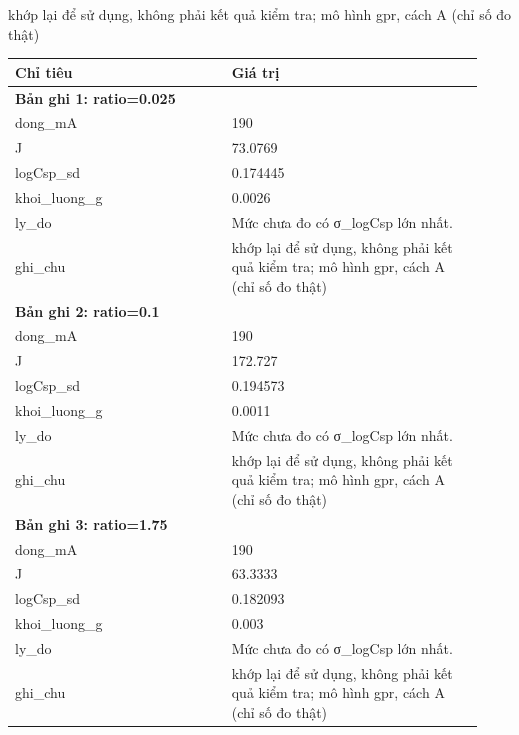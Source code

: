 \par\smallskip\noindent khớp lại để sử dụng, không phải kết quả kiểm tra; mô hình gpr, cách A (chỉ số đo thật)\par
\begin{longtable}{p{0.43\linewidth}p{0.50\linewidth}}
\toprule Chỉ tiêu & Giá trị \\ \midrule \endhead
\multicolumn{2}{p{0.95\linewidth}}{\textbf{Bản ghi 1: ratio=0.025}} \\
dong\_\allowbreak mA & 190 \\
J & 73.0769 \\
logCsp\_\allowbreak sd & 0.174445 \\
khoi\_\allowbreak luong\_\allowbreak g & 0.0026 \\
ly\_\allowbreak do & Mức chưa đo có σ\_logCsp lớn nhất. \\
ghi\_\allowbreak chu & khớp lại để sử dụng, không phải kết quả kiểm tra; mô hình gpr, cách A (chỉ số đo thật) \\
\midrule
\multicolumn{2}{p{0.95\linewidth}}{\textbf{Bản ghi 2: ratio=0.1}} \\
dong\_\allowbreak mA & 190 \\
J & 172.727 \\
logCsp\_\allowbreak sd & 0.194573 \\
khoi\_\allowbreak luong\_\allowbreak g & 0.0011 \\
ly\_\allowbreak do & Mức chưa đo có σ\_logCsp lớn nhất. \\
ghi\_\allowbreak chu & khớp lại để sử dụng, không phải kết quả kiểm tra; mô hình gpr, cách A (chỉ số đo thật) \\
\midrule
\multicolumn{2}{p{0.95\linewidth}}{\textbf{Bản ghi 3: ratio=1.75}} \\
dong\_\allowbreak mA & 190 \\
J & 63.3333 \\
logCsp\_\allowbreak sd & 0.182093 \\
khoi\_\allowbreak luong\_\allowbreak g & 0.003 \\
ly\_\allowbreak do & Mức chưa đo có σ\_logCsp lớn nhất. \\
ghi\_\allowbreak chu & khớp lại để sử dụng, không phải kết quả kiểm tra; mô hình gpr, cách A (chỉ số đo thật) \\
\midrule
\bottomrule
\end{longtable}
